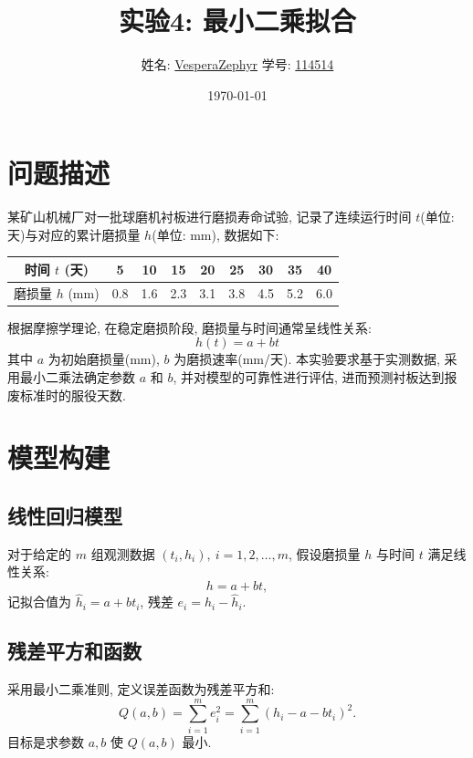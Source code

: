 \documentclass[12pt,a4paper]{ctexart}
\title{\textbf{实验4: 最小二乘拟合}}
\author{姓名: \underline{VesperaZephyr} \quad 学号: \underline{114514}}
\date{\today}
\begin{document}
\maketitle
\tableofcontents
\newpage

\section{问题描述}
某矿山机械厂对一批球磨机衬板进行磨损寿命试验, 记录了连续运行时间 $t$(单位: 天)与对应的累计磨损量 $h$(单位: mm), 数据如下: 
\begin{center}
\begin{tabular}{c|cccccccc}
\hline
时间 $t$ (天) & 5 & 10 & 15 & 20 & 25 & 30 & 35 & 40 \\
\hline
磨损量 $h$ (mm) & 0.8 & 1.6 & 2.3 & 3.1 & 3.8 & 4.5 & 5.2 & 6.0 \\
\hline
\end{tabular}
\end{center}
根据摩擦学理论, 在稳定磨损阶段, 磨损量与时间通常呈线性关系: 
\begin{equation}
h(t) = a + b t
\end{equation}
其中 $a$ 为初始磨损量(mm), $b$ 为磨损速率(mm/天). 本实验要求基于实测数据, 采用最小二乘法确定参数 $a$ 和 $b$, 并对模型的可靠性进行评估, 进而预测衬板达到报废标准时的服役天数. 

\section{模型构建}

\subsection{线性回归模型}
对于给定的 $m$ 组观测数据 $(t_i, h_i),\ i=1,2,\dots,m$, 假设磨损量 $h$ 与时间 $t$ 满足线性关系: 
\[
h = a + bt,
\]
记拟合值为 $\hat{h}_i = a + bt_i$, 残差 $e_i = h_i - \hat{h}_i$. 

\subsection{残差平方和函数}
采用最小二乘准则, 定义误差函数为残差平方和: 
\begin{equation}
Q(a,b) = \sum_{i=1}^{m} e_i^2 = \sum_{i=1}^{m} (h_i - a - b t_i)^2.
\end{equation}
目标是求参数 $a,b$ 使 $Q(a,b)$ 最小. 
\end{document}

